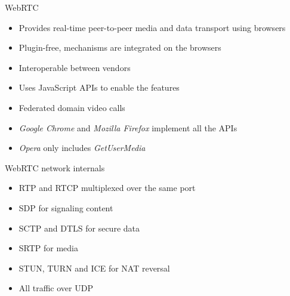 \documentclass[first=red,second=purple,logo=yellowexc]{aaltoslides}
\begin{document}
\begin{frame}{WebRTC}

\begin{itemize}
\item Provides real-time peer-to-peer media and data transport using browsers
\item Plugin-free, mechanisms are integrated on the browsers
\item Interoperable between vendors
\item Uses JavaScript APIs to enable the features
\item Federated domain video calls
\item {\it Google Chrome} and {\it Mozilla Firefox} implement all the APIs
\item {\it Opera} only includes {\it GetUserMedia}
\end{itemize}
\end{frame}


\begin{frame}{WebRTC network internals}
\begin{itemize}
\item RTP and RTCP multiplexed over the same port
\item SDP for signaling content
\item SCTP and DTLS for secure data
\item SRTP for media
\item STUN, TURN and ICE for NAT reversal
\item {\color{red}All traffic over UDP}
\end{itemize}
\end{frame}

\end{document}
